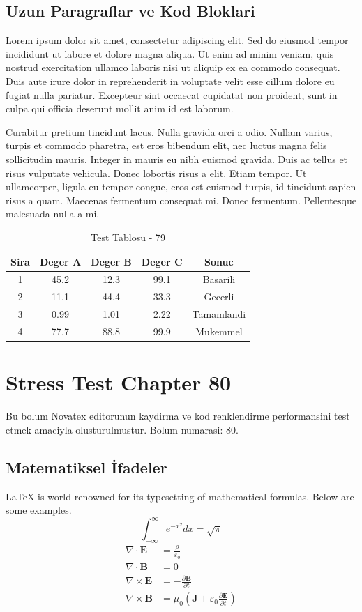 \documentclass[12pt,a4paper]{article}
\begin{document}
\subsection{Uzun Paragraflar ve Kod Bloklari}
Lorem ipsum dolor sit amet, consectetur adipiscing elit. Sed do eiusmod tempor incididunt ut labore et dolore magna aliqua. Ut enim ad minim veniam, quis nostrud exercitation ullamco laboris nisi ut aliquip ex ea commodo consequat. Duis aute irure dolor in reprehenderit in voluptate velit esse cillum dolore eu fugiat nulla pariatur. Excepteur sint occaecat cupidatat non proident, sunt in culpa qui officia deserunt mollit anim id est laborum.

Curabitur pretium tincidunt lacus. Nulla gravida orci a odio. Nullam varius, turpis et commodo pharetra, est eros bibendum elit, nec luctus magna felis sollicitudin mauris. Integer in mauris eu nibh euismod gravida. Duis ac tellus et risus vulputate vehicula. Donec lobortis risus a elit. Etiam tempor. Ut ullamcorper, ligula eu tempor congue, eros est euismod turpis, id tincidunt sapien risus a quam. Maecenas fermentum consequat mi. Donec fermentum. Pellentesque malesuada nulla a mi.

\begin{table}[h!]
\centering
\begin{tabular}{|c|c|c|c|c|}
\hline
\textbf{Sira} & \textbf{Deger A} & \textbf{Deger B} & \textbf{Deger C} & \textbf{Sonuc} \\
\hline
1 & 45.2 & 12.3 & 99.1 & Basarili \\
2 & 11.1 & 44.4 & 33.3 & Gecerli \\
3 & 0.99 & 1.01 & 2.22 & Tamamlandi \\
4 & 77.7 & 88.8 & 99.9 & Mukemmel \\
\hline
\end{tabular}
\caption{Test Tablosu - 79}
\end{table}

\newpage
\section{Stress Test Chapter 80}
Bu bolum Novatex editorunun kaydirma ve kod renklendirme performansini test etmek amaciyla olusturulmustur. Bolum numarasi: 80.

\subsection{Matematiksel İfadeler}
\LaTeX{} is world-renowned for its typesetting of mathematical formulas. Below are some examples.
\begin{equation}
\int_{-\infty}^{\infty} e^{-x^2} dx = \sqrt{\pi}
\end{equation}
\begin{align}
\nabla \cdot \mathbf{E} &= \frac{\rho}{\varepsilon_0} \\
\nabla \cdot \mathbf{B} &= 0 \\
\nabla \times \mathbf{E} &= -\frac{\partial \mathbf{B}}{\partial t} \\
\nabla \times \mathbf{B} &= \mu_0\left(\mathbf{J} + \varepsilon_0 \frac{\partial \mathbf{E}}{\partial t}\right)
\end{align}
\end{document}
